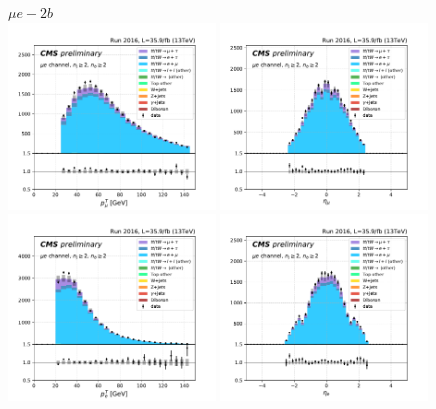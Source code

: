 \begin{figure}[ht]
    \centering
    $ \mu e- 2b$ \\
    \includegraphics[width=0.49\textwidth]{chapters/Analysis/sectionPlots/figures/kinematics_pickles/emu/2b/emu_2b_lepton1_pt.pdf}
    \includegraphics[width=0.49\textwidth]{chapters/Analysis/sectionPlots/figures/kinematics_pickles/emu/2b/emu_2b_lepton1_eta.pdf}
    \includegraphics[width=0.49\textwidth]{chapters/Analysis/sectionPlots/figures/kinematics_pickles/emu/2b/emu_2b_lepton2_pt.pdf}
    \includegraphics[width=0.49\textwidth]{chapters/Analysis/sectionPlots/figures/kinematics_pickles/emu/2b/emu_2b_lepton2_eta.pdf}

\end{figure}
